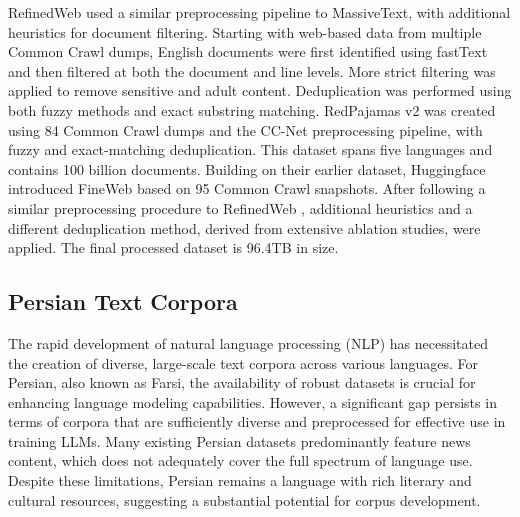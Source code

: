 RefinedWeb \citep{penedo2023refinedweb} used a similar preprocessing pipeline to MassiveText, with additional heuristics for document filtering. Starting with web-based data from multiple Common Crawl dumps, English documents were first identified using fastText \citep{athiwaratkun2018fasttext} and then filtered at both the document and line levels. More strict filtering was applied to remove sensitive and adult content. Deduplication was performed using both fuzzy methods and exact substring matching. RedPajamas v2 \citep{together2023redpajama} was created using 84 Common Crawl dumps and the CC-Net \citep{wenzek2019ccnet} preprocessing pipeline, with fuzzy and exact-matching deduplication. This dataset spans five languages and contains 100 billion documents. Building on their earlier dataset, Huggingface introduced FineWeb \citep{penedo2024fineweb} based on 95 Common Crawl snapshots. After following a similar preprocessing procedure to RefinedWeb \citep{penedo2023refinedweb}, additional heuristics and a different deduplication method, derived from extensive ablation studies, were applied. The final processed dataset is 96.4TB in size.

\subsection{Persian Text Corpora}
The rapid development of natural language processing (NLP) has necessitated the creation of diverse, large-scale text corpora across various languages. For Persian, also known as Farsi, the availability of robust datasets is crucial for enhancing language modeling capabilities. However, a significant gap persists in terms of corpora that are sufficiently diverse and preprocessed for effective use in training LLMs. Many existing Persian datasets predominantly feature news content, which does not adequately cover the full spectrum of language use. Despite these limitations, Persian remains a language with rich literary and cultural resources, suggesting a substantial potential for corpus development. 

